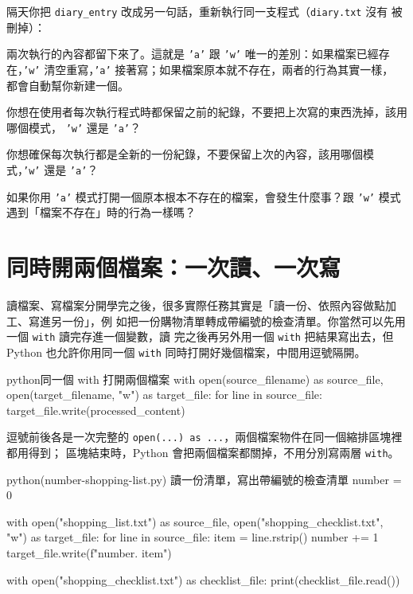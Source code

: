 隔天你把 \texttt{diary\_entry} 改成另一句話，重新執行同一支程式（\texttt{diary.txt} 沒有
被刪掉）：


兩次執行的內容都留下來了。這就是 \texttt{'a'} 跟 \texttt{'w'} 唯一的差別：如果檔案已經存
在，\texttt{'w'} 清空重寫，\texttt{'a'} 接著寫；如果檔案原本就不存在，兩者的行為其實一樣，
都會自動幫你新建一個。

\begin{drills}[label=drills:appending-files]
\item 你想在使用者每次執行程式時都保留之前的紀錄，不要把上次寫的東西洗掉，該用哪個模式，
\texttt{'w'} 還是 \texttt{'a'}？
\item 你想確保每次執行都是全新的一份紀錄，不要保留上次的內容，該用哪個模式，\texttt{'w'}
還是 \texttt{'a'}？
\item 如果你用 \texttt{'a'} 模式打開一個原本根本不存在的檔案，會發生什麼事？跟 \texttt{'w'}
模式遇到「檔案不存在」時的行為一樣嗎？
\end{drills}

\section{同時開兩個檔案：一次讀、一次寫}
\label{sec:multiple-files}

讀檔案、寫檔案分開學完之後，很多實際任務其實是「讀一份、依照內容做點加工、寫進另一份」，例
如把一份購物清單轉成帶編號的檢查清單。你當然可以先用一個 \texttt{with} 讀完存進一個變數，讀
完之後再另外用一個 \texttt{with} 把結果寫出去，但 Python 也允許你用同一個 \texttt{with}
同時打開好幾個檔案，中間用逗號隔開。

\begin{code}{python}{同一個 with 打開兩個檔案}
with open(source_filename) as source_file, open(target_filename, "w") as target_file:
    for line in source_file:
        target_file.write(processed_content)
\end{code}

逗號前後各是一次完整的 \texttt{open(...) as ...}，兩個檔案物件在同一個縮排區塊裡都用得到；
區塊結束時，Python 會把兩個檔案都關掉，不用分別寫兩層 \texttt{with}。

\begin{example}{python}{(number-shopping-list.py) 讀一份清單，寫出帶編號的檢查清單}
number = 0

with open("shopping_list.txt") as source_file, open("shopping_checklist.txt", "w") as target_file:
    for line in source_file:
        item = line.rstrip()
        number += 1
        target_file.write(f"{number}. {item}\n")

with open("shopping_checklist.txt") as checklist_file:
    print(checklist_file.read())
\end{example}

